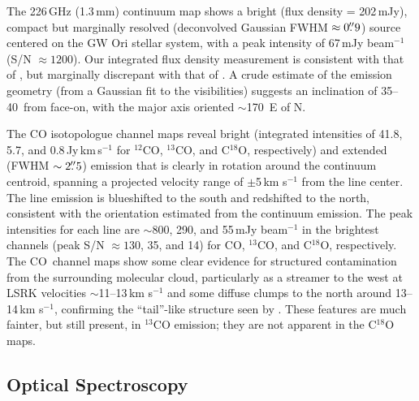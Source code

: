\documentclass[twocolumn]{aastex61}
\newcommand{\twelve}{CO}
\newcommand{\thirteen}{${}^{13}$CO}
\newcommand{\eighteen}{C${}^{18}$O}
\begin{document}
The 226\,GHz (1.3\,mm) continuum map shows a bright (flux density = 202\,mJy), compact but marginally resolved (deconvolved Gaussian FWHM $\approx 0\mbox{$.\!\!^{\prime\prime}$}9$) source centered on the GW Ori stellar system, with a peak intensity of 67\,mJy beam$^{-1}$ (S/N $\approx 1200$). Our integrated flux density measurement is consistent with that of \citet[$255 \pm 60$\,mJy]{mathieu95},  but marginally discrepant with that of \citet[$320 \pm 64$\,mJy]{fang17}. A crude estimate of the emission geometry (from a Gaussian fit to the visibilities) suggests an inclination of 35--40\degr\ from face-on, with the major axis oriented $\sim$170\degr\ E of N.

The CO isotopologue channel maps reveal bright (integrated intensities of 41.8, 5.7, and 0.8\,Jy\,km\,s$^{-1}$ for $^{12}$CO, $^{13}$CO, and C$^{18}$O, respectively) and extended (FWHM $\sim 2\mbox{$.\!\!^{\prime\prime}$}5$) emission that is clearly in rotation around the continuum centroid, spanning a projected velocity range of $\pm$5\,km s$^{-1}$ from the line center.  The line emission is blueshifted to the south and redshifted to the north, consistent with the orientation estimated from the continuum emission.
The peak intensities for each line are $\sim$800, 290, and 55\,mJy beam$^{-1}$ in the brightest channels (peak S/N $\approx 130$, 35, and 14) for \twelve, \thirteen, and \eighteen, respectively. The \twelve\ channel maps show some clear evidence for structured contamination from the surrounding molecular cloud, particularly as a streamer to the west at LSRK velocities $\sim$11--13\,km s$^{-1}$ and some diffuse clumps to the north around 13--14\,km s$^{-1}$, confirming the ``tail''-like structure seen by \citet{fang17}.  These features are much fainter, but still present, in $^{13}$CO emission; they are not apparent in the C$^{18}$O maps.

\subsection{Optical Spectroscopy \label{sec:spectroscopy}}
\end{document}
